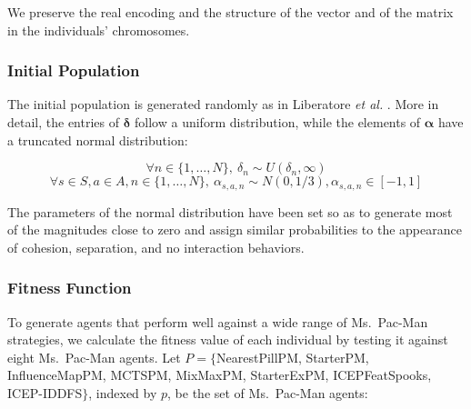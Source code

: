 \documentclass[journal]{IEEEtran}
\begin{document}
We preserve the real encoding and the structure of the vector and of the matrix in the individuals' chromosomes.

\subsubsection{Initial Population}
The initial population is generated randomly as in Liberatore \emph{et al.} \cite{Liberatore2014}. More in detail, the entries of $\boldsymbol\delta$ follow a uniform distribution, while the elements of $\boldsymbol\alpha$ have a truncated normal distribution:

\begin{small}
\begin{equation}
	\label{eq:init_radius}
	\forall n \in \{1, \ldots, N\}, \: \delta_n \sim U(\delta_n,\infty)
\end{equation}
\begin{equation}
	\label{eq:init_magnitude}
	\forall s \in S, a \in A,  n \in \{1, \ldots, N\}, \: \alpha_{s,a,n} \sim N(0,1/3), \alpha_{s,a,n} \in [-1,1]
\end{equation}
\end{small}

The parameters of the normal distribution have been set so as to generate most of the magnitudes close to zero and assign similar probabilities to the appearance of cohesion, separation, and no interaction behaviors.

\subsubsection{Fitness Function}
To generate agents that perform well against a wide range of Ms.\  Pac-Man strategies, we calculate the fitness value of each individual by testing it against eight Ms.\  Pac-Man agents. Let $P=\{$NearestPillPM, StarterPM, InfluenceMapPM, MCTSPM, MixMaxPM, StarterExPM, ICEPFeatSpooks, ICEP-IDDFS$\}$, indexed by $p$, be the set of Ms.\  Pac-Man agents:
\end{document}
